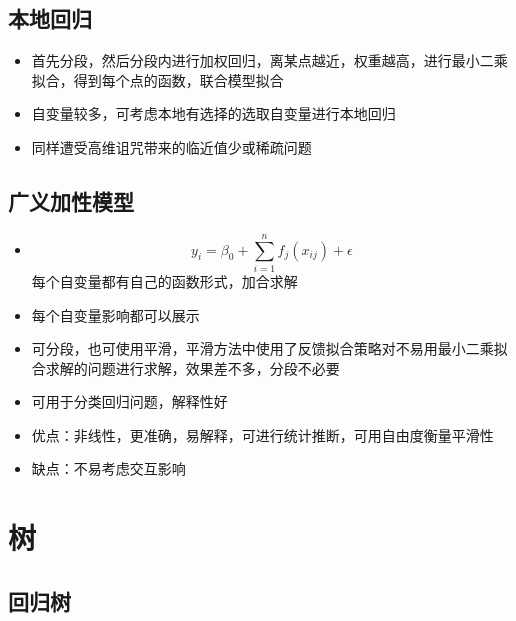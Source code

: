 \documentclass[
]{book}
\providecommand{\tightlist}{%
  \setlength{\itemsep}{0pt}\setlength{\parskip}{0pt}}
\begin{document}
\hypertarget{ux672cux5730ux56deux5f52}{%
\subsection{本地回归}\label{ux672cux5730ux56deux5f52}}

\begin{itemize}
\tightlist
\item
  首先分段，然后分段内进行加权回归，离某点越近，权重越高，进行最小二乘拟合，得到每个点的函数，联合模型拟合
\item
  自变量较多，可考虑本地有选择的选取自变量进行本地回归
\item
  同样遭受高维诅咒带来的临近值少或稀疏问题
\end{itemize}

\hypertarget{ux5e7fux4e49ux52a0ux6027ux6a21ux578b}{%
\subsection{广义加性模型}\label{ux5e7fux4e49ux52a0ux6027ux6a21ux578b}}

\begin{itemize}
\tightlist
\item
  \[y_i = \beta_0 + \sum_{i = 1}^n f_j(x_{ij}) + \epsilon\] 每个自变量都有自己的函数形式，加合求解
\item
  每个自变量影响都可以展示
\item
  可分段，也可使用平滑，平滑方法中使用了反馈拟合策略对不易用最小二乘拟合求解的问题进行求解，效果差不多，分段不必要
\item
  可用于分类回归问题，解释性好
\item
  优点：非线性，更准确，易解释，可进行统计推断，可用自由度衡量平滑性
\item
  缺点：不易考虑交互影响
\end{itemize}

\hypertarget{ux6811}{%
\section{树}\label{ux6811}}

\hypertarget{ux56deux5f52ux6811}{%
\subsection{回归树}\label{ux56deux5f52ux6811}}
\end{document}
